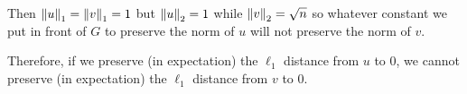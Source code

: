 \documentclass[10pt]{article}
\begin{document}
\begin{solution}[Solution]
    Then \( \left\lVert u\right\rVert_1 = \left\lVert v\right\rVert_1 = 1 \) but \( \left\lVert u\right\rVert_2 = 1 \) while \( \left\lVert v\right\rVert_2 = \sqrt{n} \) so whatever constant we put in front of \( G \) to preserve the norm of \( u \) will not preserve the norm of \( v \). 
    
    Therefore, if we preserve (in expectation) the \( \ell_1 \) distance from \( u \) to \( 0 \), we cannot preserve (in expectation) the \( \ell_1 \) distance from \( v \) to 0.





\end{solution}
\end{document}

